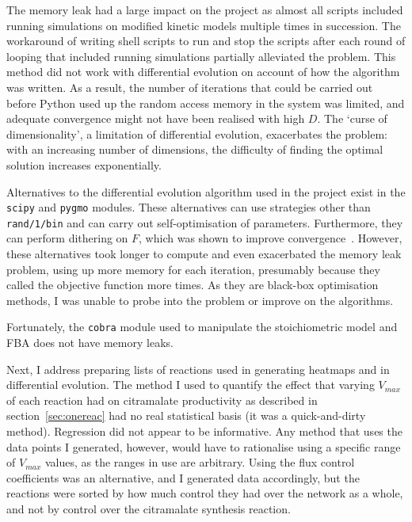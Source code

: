 \documentclass[parskip=full, numbers=noenddot]{scrreprt}
\begin{document}
The memory leak had a large impact on the project as almost all scripts included running simulations on modified kinetic models multiple times in succession. The workaround of writing shell scripts to run and stop the scripts after each round of looping that included running simulations partially alleviated the problem. This method did not work with differential evolution on account of how the algorithm was written. As a result, the number of iterations that could be carried out before Python used up the random access memory in the system was limited, and adequate convergence might not have been realised with high $D$. The `curse of dimensionality', a limitation of differential evolution, exacerbates the problem: with an increasing number of dimensions, the difficulty of finding the optimal solution increases exponentially.

Alternatives to the differential evolution algorithm used in the project exist in the \texttt{scipy} and \texttt{pygmo} modules. These alternatives can use strategies other than \texttt{rand/1/bin} and can carry out self-optimisation of parameters. Furthermore, they can perform dithering on $F$, which was shown to improve convergence~\cite{storn_usage_1996}. However, these alternatives took longer to compute and even exacerbated the memory leak problem, using up more memory for each iteration, presumably because they called the objective function more times. As they are black-box optimisation methods, I was unable to probe into the problem or improve on the algorithms.

Fortunately, the \texttt{cobra} module used to manipulate the stoichiometric model and FBA does not have memory leaks.

Next, I address preparing lists of reactions used in generating heatmaps and in differential evolution. The method I used to quantify the effect that varying $V_{max}$ of each reaction had on citramalate productivity as described in section~\ref{sec:onereac} had no real statistical basis (it was a quick-and-dirty method). Regression did not appear to be informative. Any method that uses the data points I generated, however, would have to rationalise using a specific range of $V_{max}$ values, as the ranges in use are arbitrary. Using the flux control coefficients was an alternative, and I generated data accordingly, but the reactions were sorted by how much control they had over the network as a whole, and not by control over the citramalate synthesis reaction.
\end{document}
